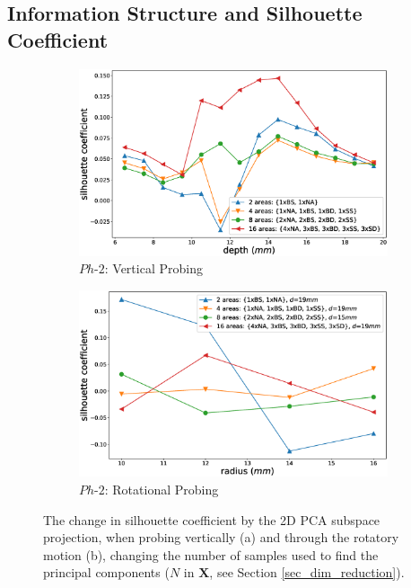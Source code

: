 \subsection{Information Structure and Silhouette Coefficient} \label{sec_inf_struct}


\begin{figure}[]
	\centering
	\begin{subfigure}[b]{\columnwidth}
		\includegraphics[width=\textwidth]{./figs/silhouette_coefficient_vertical_quantity.eps}
		\caption{$Ph\text{-}2$: Vertical Probing}
		\label{silhouette_quantity:vertical}
	\end{subfigure}
	\begin{subfigure}[b]{\columnwidth}
		\includegraphics[width=\textwidth]{./figs/silhouette_coefficient_rotation_quantity.eps}
		\caption{$Ph\text{-}2$: Rotational Probing}
		\label{silhouette_quantity:Rotation}
	\end{subfigure}
	\caption{The change in silhouette coefficient by the 2D PCA subspace projection, 
		when probing vertically (a) and through the rotatory motion (b), changing the number of samples 
		used to find the principal components ($N$ in $\mathbf{X}$, see Section \ref{sec_dim_reduction}). }
	\label{silhouette_quantity}
\end{figure}
